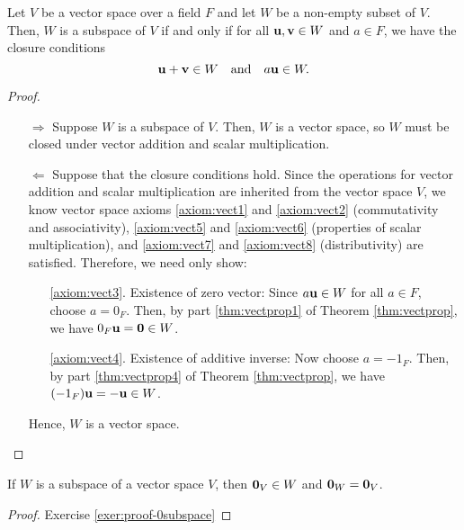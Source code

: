 \begin{thm}\label{thm:subspacetest}
Let $ V $ be a vector space over a field $ F $ and let $ W $ be a non-empty subset of $ V $. Then, $ W $ is a subspace of $ V $ if and only if for all $ \mathbf{u},\mathbf{v}\in W $ and $ a\in F $, we have the closure conditions
\begin{equation*}
    \mathbf{u}+\mathbf{v}\in W \quad\text{and}\quad a\mathbf{u}\in W.
\end{equation*}
\end{thm}
\begin{proof}~
\begin{enumerate}
    \item[$ \Rightarrow $] Suppose $ W $ is a subspace of $ V $. Then, $ W $ is a vector space, so $ W $ must be closed under vector addition and scalar multiplication.
    
    \item[$ \Leftarrow $] Suppose that the closure conditions hold. Since the operations for vector addition and scalar multiplication are inherited from the vector space $ V $, we know vector space axioms \ref{axiom:vect1} and \ref{axiom:vect2} (commutativity and associativity), \ref{axiom:vect5} and \ref{axiom:vect6} (properties of scalar multiplication), and \ref{axiom:vect7} and \ref{axiom:vect8} (distributivity) are satisfied. Therefore, we need only show:
    \begin{enumerate}
        \item[\ref{axiom:vect3}.] Existence of zero vector: Since $ a\mathbf{u}\in W $ for all $ a\in F $, choose $ a=0_F $. Then, by part \ref{thm:vectprop1} of Theorem \ref{thm:vectprop}, we have $ 0_F\mathbf{u}=\mathbf{0}\in W $.
        
        \item[\ref{axiom:vect4}.] Existence of additive inverse: Now choose $ a=-1_F $. Then, by part \ref{thm:vectprop4} of Theorem \ref{thm:vectprop}, we have $ (-1_F)\mathbf{u}=-\mathbf{u}\in W $.
    \end{enumerate}
    Hence, $ W $ is a vector space.\qedhere
\end{enumerate}
\end{proof}

\begin{lem}\label{lem:0subspace}
If $ W $ is a subspace of a vector space $ V $, then $ \mathbf{0}_V\in W $ and $ \mathbf{0}_W=\mathbf{0}_V $.
\end{lem}
\begin{proof}
Exercise \ref{exer:proof-0subspace}\noqed
\end{proof}

